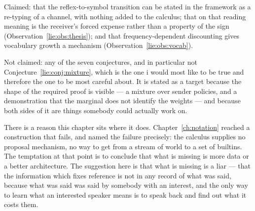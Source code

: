 Claimed: that the reflex-to-symbol transition can be stated in the framework as a
re-typing of a channel, with nothing added to the calculus; that on that reading
meaning is the receiver's forced expense rather than a property of the sign
(Observation~\ref{lie:obs:thesis}); and that frequency-dependent discounting
gives vocabulary growth a mechanism (Observation~\ref{lie:obs:vocab}).

Not claimed: any of the seven conjectures, and in particular not
Conjecture~\ref{lie:conj:mixture}, which is the one i would most like to be
true and therefore the one to be most careful about. It is stated as a target
because the shape of the required proof is visible --- a mixture over sender
policies, and a demonstration that the marginal does not identify the weights ---
and because both sides of it are things somebody could actually work on.

There is a reason this chapter sits where it does. Chapter~\ref{ch:notation}
reached a construction that fails, and named the failure precisely: the calculus
supplies no proposal mechanism, no way to get from a stream of world to a set of
builtins. The temptation at that point is to conclude that what is missing is
more data or a better architecture. The suggestion here is that what is missing
is a liar --- that the information which fixes reference is not in any record of
what was said, because what was said was said by somebody with an interest, and
the only way to learn what an interested speaker means is to speak back and find
out what it costs them.
